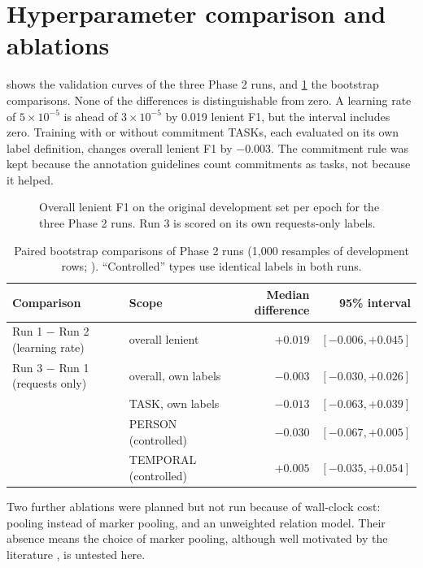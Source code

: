 \section{Hyperparameter comparison and ablations}
\label{sec:ablations}
 shows the validation curves of the three Phase 2 runs, and \cref{tab:ablation} the bootstrap comparisons. None of the differences is distinguishable from zero. A learning rate of $5\times10^{-5}$ is ahead of $3\times10^{-5}$ by 0.019 lenient F1, but the interval includes zero. Training with or without commitment TASKs, each evaluated on its own label definition, changes overall lenient F1 by $-0.003$. The commitment rule was kept because the annotation guidelines count commitments as tasks, not because it helped.

\begin{figure}[t]
\centering
{}
\caption[Learning rate and label-set comparison]{Overall lenient F1 on the original development set per epoch for the three Phase 2 runs. Run 3 is scored on its own requests-only labels.}
\label{fig:runcompare}
\end{figure}

\begin{table}[h]
\centering
\caption[Ablations with bootstrap intervals]{Paired bootstrap comparisons of Phase 2 runs (1,000 resamples of development rows; ). ``Controlled'' types use identical labels in both runs.}
\label{tab:ablation}
\footnotesize
\begin{tabular}{@{}llrr@{}}
\toprule
Comparison & Scope & Median difference & 95\% interval \\
\midrule
Run 1 $-$ Run 2 (learning rate) & overall lenient & $+0.019$ & $[-0.006, +0.045]$ \\
Run 3 $-$ Run 1 (requests only) & overall, own labels & $-0.003$ & $[-0.030, +0.026]$ \\
 & TASK, own labels & $-0.013$ & $[-0.063, +0.039]$ \\
 & PERSON (controlled) & $-0.030$ & $[-0.067, +0.005]$ \\
 & TEMPORAL (controlled) & $+0.005$ & $[-0.035, +0.054]$ \\
\bottomrule
\end{tabular}
\end{table}

Two further ablations were planned but not run because of wall-clock cost: \code{[CLS]} pooling instead of marker pooling, and an unweighted relation model. Their absence means the choice of marker pooling, although well motivated by the literature \citep{baldinisoares2019mtb,zhong2021pure}, is untested here.

